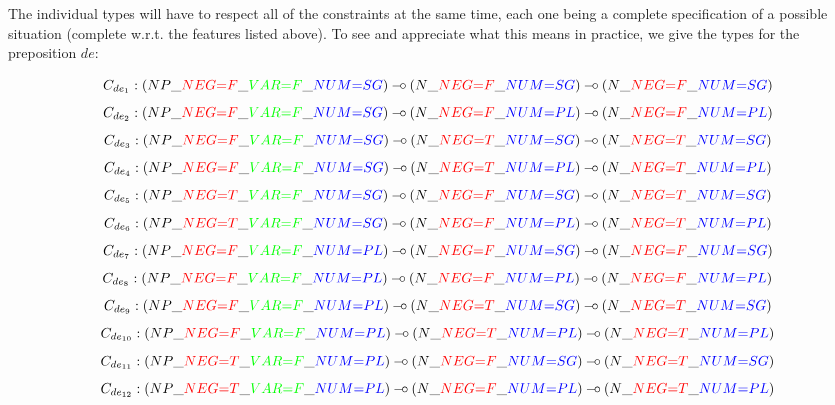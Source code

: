The individual types will have to respect all of the constraints at the
same time, each one being a complete specification of a possible
situation (complete w.r.t. the features listed above). To see and
appreciate what this means in practice, we give the types for the
preposition $de$:

$$
C_{de_1} : (NP\_\textcolor{red}{NEG{=}F}\_\textcolor{green}{VAR{=}F}\_\textcolor{blue}{NUM{=}SG}) \mathbin{{-}\mkern-3.5mu{\circ}} (N\_\textcolor{red}{NEG{=}F}\_\textcolor{blue}{NUM{=}SG}) \mathbin{{-}\mkern-3.5mu{\circ}} (N\_\textcolor{red}{NEG{=}F}\_\textcolor{blue}{NUM{=}SG})
$$
$$
C_{de_2} : (NP\_\textcolor{red}{NEG{=}F}\_\textcolor{green}{VAR{=}F}\_\textcolor{blue}{NUM{=}SG}) \mathbin{{-}\mkern-3.5mu{\circ}} (N\_\textcolor{red}{NEG{=}F}\_\textcolor{blue}{NUM{=}PL}) \mathbin{{-}\mkern-3.5mu{\circ}} (N\_\textcolor{red}{NEG{=}F}\_\textcolor{blue}{NUM{=}PL})
$$
$$
C_{de_3} : (NP\_\textcolor{red}{NEG{=}F}\_\textcolor{green}{VAR{=}F}\_\textcolor{blue}{NUM{=}SG}) \mathbin{{-}\mkern-3.5mu{\circ}} (N\_\textcolor{red}{NEG{=}T}\_\textcolor{blue}{NUM{=}SG}) \mathbin{{-}\mkern-3.5mu{\circ}} (N\_\textcolor{red}{NEG{=}T}\_\textcolor{blue}{NUM{=}SG})
$$
$$
C_{de_4} : (NP\_\textcolor{red}{NEG{=}F}\_\textcolor{green}{VAR{=}F}\_\textcolor{blue}{NUM{=}SG}) \mathbin{{-}\mkern-3.5mu{\circ}} (N\_\textcolor{red}{NEG{=}T}\_\textcolor{blue}{NUM{=}PL}) \mathbin{{-}\mkern-3.5mu{\circ}} (N\_\textcolor{red}{NEG{=}T}\_\textcolor{blue}{NUM{=}PL})
$$
$$
C_{de_5} : (NP\_\textcolor{red}{NEG{=}T}\_\textcolor{green}{VAR{=}F}\_\textcolor{blue}{NUM{=}SG}) \mathbin{{-}\mkern-3.5mu{\circ}} (N\_\textcolor{red}{NEG{=}F}\_\textcolor{blue}{NUM{=}SG}) \mathbin{{-}\mkern-3.5mu{\circ}} (N\_\textcolor{red}{NEG{=}T}\_\textcolor{blue}{NUM{=}SG})
$$
$$
C_{de_6} : (NP\_\textcolor{red}{NEG{=}T}\_\textcolor{green}{VAR{=}F}\_\textcolor{blue}{NUM{=}SG}) \mathbin{{-}\mkern-3.5mu{\circ}} (N\_\textcolor{red}{NEG{=}F}\_\textcolor{blue}{NUM{=}PL}) \mathbin{{-}\mkern-3.5mu{\circ}} (N\_\textcolor{red}{NEG{=}T}\_\textcolor{blue}{NUM{=}PL})
$$
$$
C_{de_7} : (NP\_\textcolor{red}{NEG{=}F}\_\textcolor{green}{VAR{=}F}\_\textcolor{blue}{NUM{=}PL}) \mathbin{{-}\mkern-3.5mu{\circ}} (N\_\textcolor{red}{NEG{=}F}\_\textcolor{blue}{NUM{=}SG}) \mathbin{{-}\mkern-3.5mu{\circ}} (N\_\textcolor{red}{NEG{=}F}\_\textcolor{blue}{NUM{=}SG})
$$
$$
C_{de_8} : (NP\_\textcolor{red}{NEG{=}F}\_\textcolor{green}{VAR{=}F}\_\textcolor{blue}{NUM{=}PL}) \mathbin{{-}\mkern-3.5mu{\circ}} (N\_\textcolor{red}{NEG{=}F}\_\textcolor{blue}{NUM{=}PL}) \mathbin{{-}\mkern-3.5mu{\circ}} (N\_\textcolor{red}{NEG{=}F}\_\textcolor{blue}{NUM{=}PL})
$$
$$
C_{de_9} : (NP\_\textcolor{red}{NEG{=}F}\_\textcolor{green}{VAR{=}F}\_\textcolor{blue}{NUM{=}PL}) \mathbin{{-}\mkern-3.5mu{\circ}} (N\_\textcolor{red}{NEG{=}T}\_\textcolor{blue}{NUM{=}SG}) \mathbin{{-}\mkern-3.5mu{\circ}} (N\_\textcolor{red}{NEG{=}T}\_\textcolor{blue}{NUM{=}SG})
$$
$$
C_{de_{10}} : (NP\_\textcolor{red}{NEG{=}F}\_\textcolor{green}{VAR{=}F}\_\textcolor{blue}{NUM{=}PL}) \mathbin{{-}\mkern-3.5mu{\circ}} (N\_\textcolor{red}{NEG{=}T}\_\textcolor{blue}{NUM{=}PL}) \mathbin{{-}\mkern-3.5mu{\circ}} (N\_\textcolor{red}{NEG{=}T}\_\textcolor{blue}{NUM{=}PL})
$$
$$
C_{de_{11}} : (NP\_\textcolor{red}{NEG{=}T}\_\textcolor{green}{VAR{=}F}\_\textcolor{blue}{NUM{=}PL}) \mathbin{{-}\mkern-3.5mu{\circ}} (N\_\textcolor{red}{NEG{=}F}\_\textcolor{blue}{NUM{=}SG}) \mathbin{{-}\mkern-3.5mu{\circ}} (N\_\textcolor{red}{NEG{=}T}\_\textcolor{blue}{NUM{=}SG})
$$
$$
C_{de_{12}} : (NP\_\textcolor{red}{NEG{=}T}\_\textcolor{green}{VAR{=}F}\_\textcolor{blue}{NUM{=}PL}) \mathbin{{-}\mkern-3.5mu{\circ}} (N\_\textcolor{red}{NEG{=}F}\_\textcolor{blue}{NUM{=}PL}) \mathbin{{-}\mkern-3.5mu{\circ}} (N\_\textcolor{red}{NEG{=}T}\_\textcolor{blue}{NUM{=}PL})
$$

